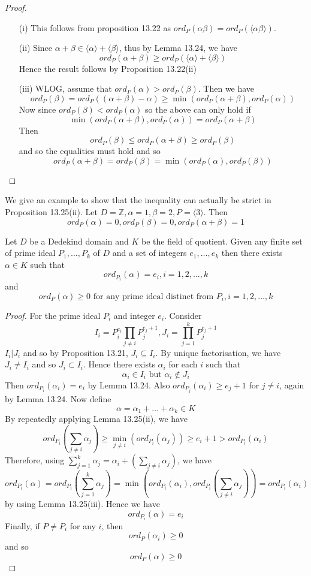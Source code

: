 \begin{proof}
\begin{enumerate}
\item[(i)] This follows from proposition 13.22 as $ord_P(\alpha \beta)=ord_P(\langle \alpha \beta \rangle)$.
\item[(ii)] Since $\alpha+\beta \in \langle \alpha \rangle+ \langle \beta \rangle$, thus by Lemma 13.24, we have
    $$ord_P(\alpha+\beta) \ge ord_P(\langle \alpha \rangle +\langle \beta \rangle)$$
    Hence the result follows by Proposition 13.22(ii)
\item[(iii)] WLOG, assume that $ord_P(\alpha) > ord_P(\beta)$.
Then we have
$$ord_P(\beta)=ord_P((\alpha+\beta)-\alpha) \ge \min{(ord_P(\alpha+\beta),ord_P(\alpha))}$$
Now since $ord_P(\beta) < ord_P(\alpha)$ so the above can only hold if
$$\min{(ord_P(\alpha+\beta),ord_P(\alpha))}=ord_P(\alpha+\beta)$$
Then
$$ord_P(\beta) \le ord_P(\alpha+\beta) \ge ord_P(\beta)$$
and so the equalities must hold and so
$$ord_P(\alpha+\beta)=ord_P(\beta)=\min{(ord_P(\alpha),ord_P(\beta))}$$
\end{enumerate}
\end{proof}
\begin{example} We give an example to show that the inequality can actually be strict in Proposition 13.25(ii).
Let $D=\mathbb{Z}, \alpha=1,\beta=2, P=\langle 3 \rangle$. Then
$$ord_P(\alpha)=0,ord_P(\beta)=0, ord_P(\alpha+\beta)=1$$
\end{example}
\begin{theorem} Let $D$ be a Dedekind domain and $K$ be the field of quotient. Given any finite set of prime ideal
$P_1,\ldots,P_k$ of $D$ and a set of integers $e_1,\ldots,e_k$ then there exists $\alpha \in K$ such that
$$ord_{P_i}(\alpha)=e_i, i=1,2,\ldots,k$$
and
$$ord_P(\alpha) \ge 0 \text{ for any prime ideal distinct from } P_i,i=1,2,\ldots,k$$
\end{theorem}
\begin{proof}
For the prime ideal $P_i$ and integer $e_i$. Consider
$$I_i=P^{e_i}_i \prod_{j \neq i}P^{e_j+1}_j, J_i= \prod_{j=1}^k P^{e_j+1}_j$$
$I_i |J_i$ and so by Proposition 13.21, $J_i \subseteq I_i$.
By unique factorisation, we have $J_i \neq I_i$ and so $J_i \subset I_i$. Hence there exists
$\alpha_i$ for each $i$ such that
$$\alpha_i \in I_i \text{ but } \alpha_i \not \in J_i$$
Then $ord_{P_i}(\alpha_i)=e_i$ by Lemma 13.24. Also $ord_{P_j}(\alpha_i) \ge e_j+1$ for $j \neq i$, again by Lemma 13.24. Now define
$$\alpha=\alpha_1+\ldots+\alpha_k \in K$$
By repeatedly applying Lemma 13.25(ii), we have
$$ord_{P_i}\left(\sum_{j \neq i}\alpha_j\right) \ge \min_{j \neq i}(ord_{P_i}(\alpha_j)) \ge e_i+1>ord_{P_i}\left(\alpha_i\right)$$
Therefore, using $\sum_{j=1}^k \alpha_j=\alpha_i +(\sum_{j \neq i} \alpha_j)$, we have
$$ord_{P_i}\left(\alpha\right)=ord_{P_i}\left(\sum_{j=1}^k \alpha_j\right)=\min{\left(ord_{P_i}(\alpha_i),ord_{P_i}(\sum_{j \neq i}\alpha_j)\right)}
=ord_{P_i}\left(\alpha_i\right)$$
by using Lemma 13.25(iii). Hence we have
$$ord_{P_i}(\alpha)=e_i$$
Finally, if $P \neq P_i$ for any $i$, then
$$ord_P(\alpha_i) \ge 0$$
and so
$$ord_P(\alpha) \ge 0$$
\end{proof}
